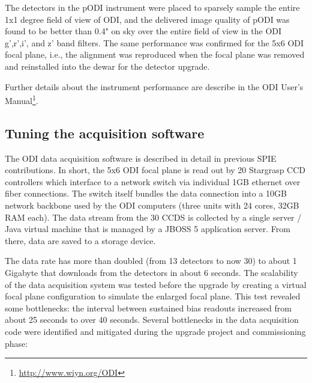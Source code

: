 \documentclass[]{spieman}
\begin{document}
The detectors in the pODI instrument were placed to sparsely sample the entire 1x1 degree
field of view of ODI, and the delivered image quality of pODI was found to be
better than 0.4" on sky over the entire field of view in the ODI g',r',i', and
z' band filters. The same performance was confirmed for the 5x6 ODI focal plane,
i.e., the alignment was reproduced when the focal plane was removed and
reinstalled into the dewar for the detector upgrade.

Further details about the instrument performance are describe in the ODI User's
Manual\footnote{\url{http://www.wiyn.org/ODI}}.


\subsection{Tuning the acquisition software}

The ODI data acquisition software is described in detail in previous SPIE
contributions\cite{Yeatts2008,Yeatts2010}. In short, the 5x6 ODI focal plane is
read out by 20 Stargrasp CCD controllers which interface to a network switch via
individual  1GB ethernet over fiber connections. The switch itself bundles the
data connection into a 10GB network backbone used by the ODI computers (three
units with 24 cores, 32GB RAM each). The data stream from the 30 CCDS is
collected by a single server / Java virtual machine that is managed by a JBOSS 5
application server. From there, data are saved to a storage device.

The data rate has more than doubled (from 13 detectors to now 30) to about 1
Gigabyte that downloads from the detectors in about 6 seconds.  The scalability
of the data acquisition system was tested before the upgrade by creating a
virtual focal plane  configuration to simulate the enlarged focal plane. This
test revealed some bottlenecks: the interval between sustained bias readouts
increased from about 25 seconds to over 40 seconds. Several bottlenecks in the
data acquisition code were identified and mitigated during the upgrade project
and commissioning phase:
\end{document}
